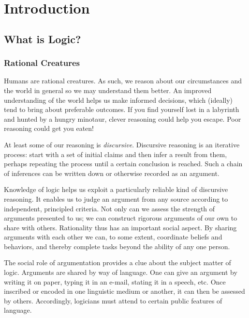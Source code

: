 
\chapter{Introduction}\label{introduction}

\section{What is Logic?}\label{What Is Logic}
\subsection{Rational Creatures}\label{Rational Creatures}

Humans are rational creatures. 
As such, we reason about our circumstances and the world in general so we may understand them better. 
An improved understanding of the world helps us make informed decisions, which (ideally) tend to bring about preferable outcomes. 
If you find yourself lost in a labyrinth and hunted by a hungry minotaur, clever reasoning could help you escape. 
Poor reasoning could get you eaten! 

At least some of our reasoning is \emph{discursive}. 
Discursive reasoning is an iterative process: start with a set of initial claims and then infer a result from them, perhaps repeating the process until a certain conclusion is reached. 
Such a chain of inferences can be written down or otherwise recorded as an argument.

Knowledge of logic helps us exploit a particularly reliable kind of discursive reasoning. 
It enables us to judge an argument from any source according to independent, principled criteria.
Not only can we assess the strength of arguments presented to us; we can construct rigorous arguments of our own to share with others. 
Rationality thus has an important social aspect. 
By sharing arguments with each other we can, to some extent, coordinate beliefs and behaviors, and thereby complete tasks beyond the ability of any one person. 

The social role of argumentation provides a clue about the subject matter of logic. 
Arguments are shared by way of language. 
One can give an argument by writing it on paper, typing it in an e-mail, stating it in a speech, etc. 
Once inscribed or encoded in one linguistic medium or another, it can then be assessed by others. 
Accordingly, logicians must attend to certain public features of language. 

